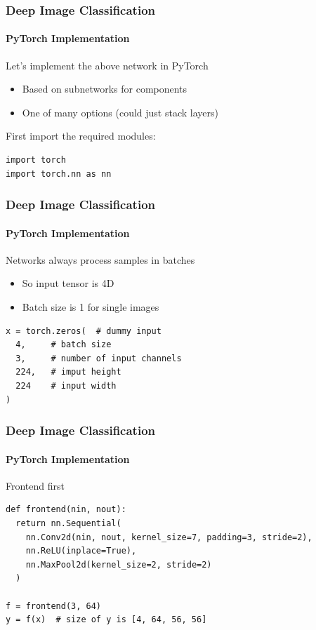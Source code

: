 \documentclass[xetex,professionalfont]{beamer}
\begin{document}
\begin{frame}[fragile]
\frametitle{Deep Image Classification}
\framesubtitle{PyTorch Implementation}

Let's implement the above network in PyTorch
\begin{itemize}
    \item Based on subnetworks for components
    \item One of many options (could just stack layers)
\end{itemize}

\bigskip

First import the required modules:

\medskip

\footnotesize
\begin{verbatim}
import torch
import torch.nn as nn
\end{verbatim}

\end{frame}


\begin{frame}[fragile]
\frametitle{Deep Image Classification}
\framesubtitle{PyTorch Implementation}

Networks always process samples in batches
\begin{itemize}
    \item So input tensor is 4D
    \item Batch size is 1 for single images
\end{itemize}

\medskip

\footnotesize
\begin{verbatim}
x = torch.zeros(  # dummy input
  4,     # batch size
  3,     # number of input channels
  224,   # imput height
  224    # input width
)
\end{verbatim}

\end{frame}


\begin{frame}[fragile]
\frametitle{Deep Image Classification}
\framesubtitle{PyTorch Implementation}

Frontend first

\medskip

\footnotesize
\begin{verbatim}
def frontend(nin, nout):
  return nn.Sequential(
    nn.Conv2d(nin, nout, kernel_size=7, padding=3, stride=2),
    nn.ReLU(inplace=True),
    nn.MaxPool2d(kernel_size=2, stride=2)
  )

f = frontend(3, 64)
y = f(x)  # size of y is [4, 64, 56, 56]
\end{verbatim}

\end{frame}
\end{document}
